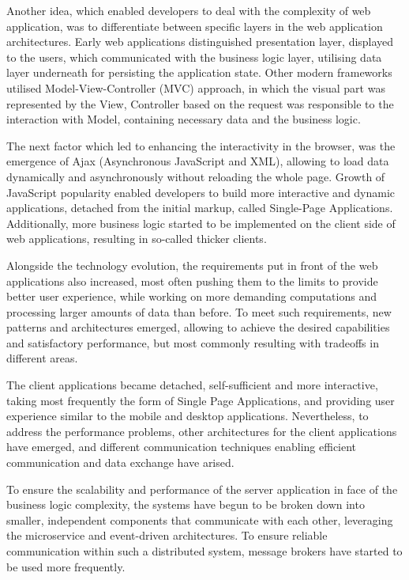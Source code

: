 Another idea, which enabled developers to deal with the complexity of web application, was to differentiate between specific layers in the web application architectures. Early web applications distinguished presentation layer, displayed to the users, which communicated with the business logic layer, utilising data layer underneath for persisting the application state. Other modern frameworks utilised Model-View-Controller (MVC) approach, in which the visual part was represented by the View, Controller based on the request was responsible to the interaction with Model, containing necessary data and the business logic.

The next factor which led to enhancing the interactivity in the browser, was the emergence of Ajax (Asynchronous JavaScript and XML), allowing to load data dynamically and asynchronously without reloading the whole page. Growth of JavaScript popularity enabled developers to build more interactive and dynamic applications, detached from the initial markup, called Single-Page Applications. Additionally, more business logic started to be implemented on the client side of web applications, resulting in so-called thicker clients.

Alongside the technology evolution, the requirements put in front of the web applications also increased, most often pushing them to the limits to provide better user experience, while working on more demanding computations and processing larger amounts of data than before. To meet such requirements, new patterns and architectures emerged, allowing to achieve the desired capabilities and satisfactory performance, but most commonly resulting with tradeoffs in different areas.

The client applications became detached, self-sufficient and more interactive, taking most frequently the form of Single Page Applications, and providing user experience similar to the mobile and desktop applications. Nevertheless, to address the performance problems, other architectures for the client applications have emerged, and different communication techniques enabling efficient communication and data exchange have arised.

To ensure the scalability and performance of the server application in face of the business logic complexity, the systems have begun to be broken down into smaller, independent components that communicate with each other, leveraging the microservice and event-driven architectures. To ensure reliable communication within such a distributed system, message brokers have started to be used more frequently.

